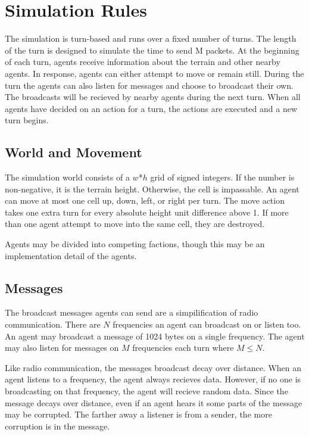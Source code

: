 \section{Simulation Rules} \label{rules}

The simulation is turn-based and runs over a fixed number of turns. The length of the turn is
designed to simulate the time to send M packets. At the beginning of each turn, agents receive
information about the terrain and other nearby agents. In response, agents can either attempt to
move or remain still. During the turn the agents can also listen for messages and choose to
broadcast their own. The broadcasts will be recieved by nearby agents during the next turn. When all
agents have decided on an action for a turn, the actions are executed and a new turn begins.

\subsection{World and Movement}

The simulation world consists of a $w$*$h$ grid of signed integers. If the number is non-negative,
it is the terrain height. Otherwise, the cell is impassable. An agent can move at most one cell up,
down, left, or right per turn. The move action takes one extra turn for every absolute height unit
difference above 1. If more than one agent attempt to move into the same cell, they are destroyed.

Agents may be divided into competing factions, though this may be an implementation detail of the
agents.

\subsection{Messages}

The broadcast messages agents can send are a simpilification of radio communication. There are $N$
frequencies an agent can broadcast on or listen too. An agent may broadcast a message of 1024 bytes
on a single frequency. The agent may also listen for messages on $M$ frequencies each turn where $M
\leq N$.

Like radio communication, the messages broadcast decay over distance. When an agent listens to a
frequency, the agent always recieves data. However, if no one is broadcasting on that frequency, the
agent will recieve random data. Since the message decays over distance, even if an agent hears it
some parts of the message may be corrupted. The farther away a listener is from a sender, the more
corruption is in the message.

